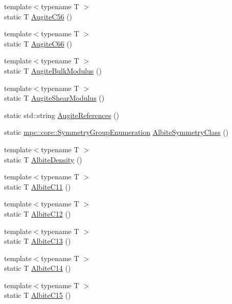 \begin{DoxyCompactItemize}
\item 
{\footnotesize template$<$typename T $>$ }\\static T \mbox{\hyperlink{namespacempc_1_1data_aacea95abc86c017e0966d8a34aaeb8cb}{Augite\+C56}} ()
\item 
{\footnotesize template$<$typename T $>$ }\\static T \mbox{\hyperlink{namespacempc_1_1data_ad769ef8aab929b4093ec9257a7ae0aa2}{Augite\+C66}} ()
\item 
{\footnotesize template$<$typename T $>$ }\\static T \mbox{\hyperlink{namespacempc_1_1data_a7ec03e2258275e911854465c3bfd85b0}{Augite\+Bulk\+Modulus}} ()
\item 
{\footnotesize template$<$typename T $>$ }\\static T \mbox{\hyperlink{namespacempc_1_1data_a7d5269d1222a5af21c30548f3817b471}{Augite\+Shear\+Modulus}} ()
\item 
static std\+::string \mbox{\hyperlink{namespacempc_1_1data_aa182e1c0a37db3283f62de64b49a7677}{Augite\+References}} ()
\item 
static \mbox{\hyperlink{namespacempc_1_1core_a9d979684062547055a0ef5c13077bad8}{mpc\+::core\+::\+Symmetry\+Group\+Enumeration}} \mbox{\hyperlink{namespacempc_1_1data_a09dfba81a3420ba422786b5b8b52f89d}{Albite\+Symmetry\+Class}} ()
\item 
{\footnotesize template$<$typename T $>$ }\\static T \mbox{\hyperlink{namespacempc_1_1data_aa88e3a21f0fb3001b8d14c1c65844fe0}{Albite\+Density}} ()
\item 
{\footnotesize template$<$typename T $>$ }\\static T \mbox{\hyperlink{namespacempc_1_1data_a830c8b5582400390734122f8a641bb1e}{Albite\+C11}} ()
\item 
{\footnotesize template$<$typename T $>$ }\\static T \mbox{\hyperlink{namespacempc_1_1data_a54f2b1fa5ba8a083a0b879c37d79e93f}{Albite\+C12}} ()
\item 
{\footnotesize template$<$typename T $>$ }\\static T \mbox{\hyperlink{namespacempc_1_1data_aa7369eb2c82919fe6fff2b09778a556b}{Albite\+C13}} ()
\item 
{\footnotesize template$<$typename T $>$ }\\static T \mbox{\hyperlink{namespacempc_1_1data_acf3383c56c283133ceff8ecc6f09c309}{Albite\+C14}} ()
\item 
{\footnotesize template$<$typename T $>$ }\\static T \mbox{\hyperlink{namespacempc_1_1data_ae7a0765ecfa5c75d0ddb726d511abbbd}{Albite\+C15}} ()

\end{DoxyCompactItemize}
